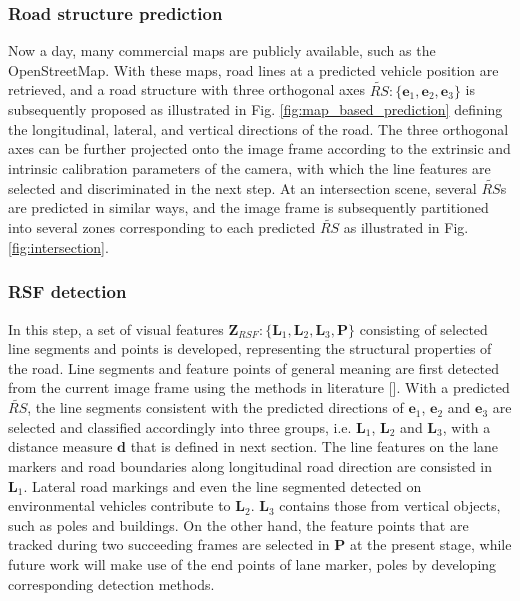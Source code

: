 \documentclass[letterpaper, 10 pt, conference]{ieeeconf}  %
\begin{document}
\subsubsection{Road structure prediction}
Now a day, many commercial maps are publicly available, such as the OpenStreetMap. With these maps, road lines at a predicted vehicle position are retrieved, and a road structure with three orthogonal axes $\tilde{RS}:\{\mathbf{e}_1,\mathbf{e}_2,\mathbf{e}_3\}$ is subsequently proposed as illustrated in Fig. \ref{fig:map_based_prediction} defining the longitudinal, lateral, and vertical directions of the road. The three orthogonal axes can be further projected onto the image frame according to the extrinsic and intrinsic calibration parameters of the camera, with which the line features are selected and discriminated in the next step. At an intersection scene, several $\tilde{RS}$s are predicted in similar ways, and the image frame is subsequently partitioned into several zones corresponding to each predicted $\tilde{RS}$ as illustrated in Fig. \ref{fig:intersection}.


\subsubsection{RSF detection}
In this step, a set of visual features $\mathbf{Z}_{RSF}:\{\mathbf{L}_1,\mathbf{L}_2,\mathbf{L}_3,\mathbf{P}\}$ consisting of selected line segments and points is developed, representing the  structural properties of the road. Line segments and feature points of general meaning are first detected from the current image frame using the methods in literature []. With a predicted $\tilde{RS}$, the line segments consistent with the predicted directions of $\mathbf{e}_1$, $\mathbf{e}_2$ and $\mathbf{e}_3$ are selected and classified accordingly into three groups, i.e. $\mathbf{L}_1$, $\mathbf{L}_2$ and $\mathbf{L}_3$, with a distance measure $\mathbf{d}$ that is defined in next section.
The line features on the lane markers and road boundaries along longitudinal road direction are consisted in $\mathbf{L}_1$. Lateral road markings and even the line segmented detected on environmental vehicles contribute to $\mathbf{L}_2$. $\mathbf{L}_3$ contains those from vertical objects, such as poles and buildings. On the other hand, the feature points that are tracked during two succeeding frames are selected in $\mathbf{P}$ at the present stage, while future work will make use of the end points of lane marker, poles by developing corresponding detection methods.
\end{document}
